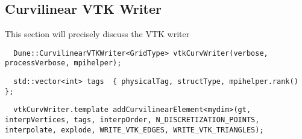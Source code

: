 \subsection{Curvilinear VTK Writer}
\label{interface-vtk-writer}


This section will precisely discuss the VTK writer

\begin{mybox}
\begin{lstlisting}
  Dune::CurvilinearVTKWriter<GridType> vtkCurvWriter(verbose, processVerbose, mpihelper);
\end{lstlisting}
\end{mybox}

\begin{mybox}
\begin{lstlisting}
  std::vector<int> tags  { physicalTag, structType, mpihelper.rank() };
\end{lstlisting}
\end{mybox}

\begin{mybox}
\begin{lstlisting}
  vtkCurvWriter.template addCurvilinearElement<mydim>(gt, interpVertices, tags, interpOrder, N_DISCRETIZATION_POINTS, interpolate, explode, WRITE_VTK_EDGES, WRITE_VTK_TRIANGLES);
\end{lstlisting}
\end{mybox}